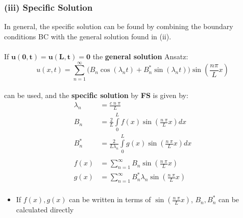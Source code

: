 \subsubsection{(iii) Specific Solution}
In general, the specific solution can be found by combining the boundary conditions BC 
with the general solution found in (ii).\\\\
If $\mathbf{u(0,t)=u(L,t)= 0}$ the \textbf{general solution} Ansatz:
\begin{equation*}
    u(x,t)=\sum\limits_{n=1}^{\infty}
    \Bigr( B_n \cos(\lambda _n t)+B_n^* \sin(\lambda_n t)\Bigr) \sin 
    \left(\frac{n \pi}{L}x \right)
\end{equation*}\\
can be used, and the \textbf{specific solution} by \textbf{FS} is given by:
\begin{align*}
    \lambda_n&=\frac{c\; n\; \pi}{L}\\
    B_n&=\frac{2}{L}\int\limits_0^L f(x)\sin(\frac{n\;\pi}{L}x)dx\\
    B_n^*&=\frac{2}{L\lambda_n} \int\limits_0^L g(x) \sin(\frac{n\;\pi}{L}x)dx\\\\
    f(x)&=\sum\limits_{n=1}^{\infty} B_n \sin(\frac{n\;\pi}{L}x)\\
    g(x)&=\sum\limits_{n=1}^{\infty} B_n^* \lambda_n \sin(\frac{n\;\pi}{L}x)\\
\end{align*}
\begin{itemize}
    \item If $f(x),g(x)$ can be written in terms of $\sin(\frac{n\;\pi}{L}x)$, $B_n, B_n^*$ 
    can be calculated directly
\end{itemize}
%
%

